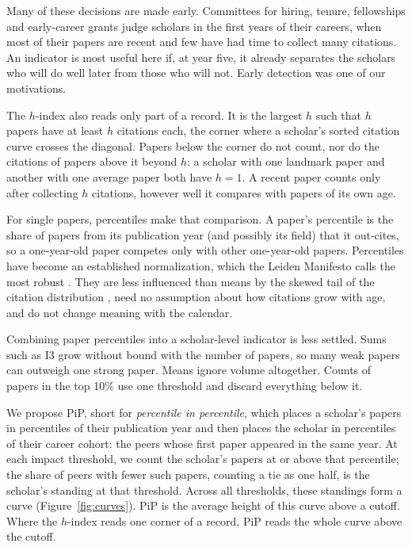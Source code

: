 \documentclass[11pt]{article}
\begin{document}
Many of these decisions are made early. Committees for hiring, tenure, fellowships and early-career grants judge
scholars in the first years of their careers, when most of their papers are recent and few have had time to collect many
citations. An indicator is most useful here if, at year five, it already separates the scholars who will do well later
from those who will not. Early detection was one of our motivations.

The $h$-index also reads only part of a record. It is the largest $h$ such that $h$ papers have at least $h$ citations
each, the corner where a scholar's sorted citation curve crosses the diagonal. Papers below the corner do not count,
nor do the citations of papers above it beyond $h$: a scholar with one landmark paper and another with one average
paper both have $h = 1$. A recent paper counts only after collecting $h$ citations, however well it compares with
papers of its own age.

For single papers, percentiles make that comparison. A paper's percentile is the share of papers from its publication
year (and possibly its field) that it out-cites, so a one-year-old paper competes only with other one-year-old papers.
Percentiles have become an established normalization, which the Leiden Manifesto calls the most robust
\citep{bornmann2013use,waltman2016review,hicks2015bibliometrics}. They are less influenced than means by the skewed
tail of the citation distribution \citep{bornmann2013use}, need no assumption about how citations grow with age, and
do not change meaning with the calendar.

Combining paper percentiles into a scholar-level indicator is less settled. Sums such as I3
\citep{leydesdorff2011integrated} grow without bound with the number of papers, so many weak papers can outweigh one
strong paper. Means ignore volume altogether. Counts of papers in the top 10\%
\citep{waltman2012leiden,bornmann2014individual} use one threshold and discard everything below it.

We propose PiP, short for \emph{percentile in percentile}, which places a scholar's papers in percentiles of their
publication year and then places the scholar in percentiles of their career cohort: the peers whose first paper appeared
in the same year. At each impact threshold, we count the scholar's papers at or above that percentile; the share of peers
with fewer such papers, counting a tie as one half, is the scholar's standing at that threshold. Across all thresholds,
these standings form a curve
(Figure~\ref{fig:curves}). PiP is the average height of this curve above a cutoff. Where the $h$-index reads one corner
of a record, PiP reads the whole curve above the cutoff.
\end{document}
